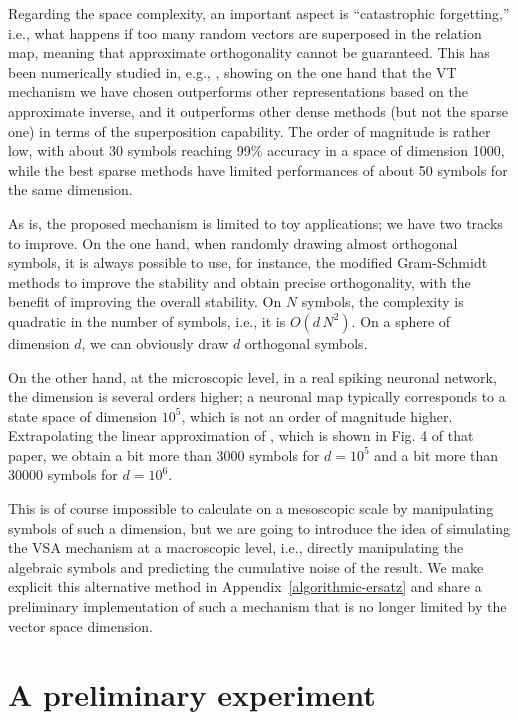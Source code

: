 \documentclass[sn-mathphys]{sn-jnl}
\begin{document}
Regarding the space complexity, an important aspect is ``catastrophic forgetting,'' i.e., what happens if too many random vectors are superposed in the relation map, meaning that approximate orthogonality cannot be guaranteed. This has been numerically studied in, e.g., \cite{schlegel_comparison_2020}, showing on the one hand that the VT mechanism we have chosen outperforms other representations based on the approximate inverse, and it outperforms other dense methods (but not the sparse one) in terms of the superposition capability. The order of magnitude is rather low, with about 30 symbols reaching 99\% accuracy in a space of dimension 1000, while the best sparse methods have limited performances of about 50 symbols for the same dimension.

As is, the proposed mechanism is limited to toy applications; we have two tracks to improve. On the one hand, when randomly drawing almost orthogonal symbols, it is always possible to use, for instance, the modified Gram-Schmidt methods to improve the stability and obtain precise orthogonality, with the benefit of improving the overall stability. On $N$ symbols, the complexity is quadratic in the number of symbols, i.e., it is $O(d\, N^2)$. On a sphere of dimension $d$, we can obviously draw $d$ orthogonal symbols.

On the other hand, at the microscopic level, in a real spiking neuronal network, the dimension is several orders higher; a neuronal map typically corresponds to a state space of dimension $10^5$, which is not an order of magnitude higher.  Extrapolating the linear approximation of \cite{schlegel_comparison_2020}, which is shown in Fig. 4 of that paper, we obtain a bit more than $3000$ symbols for $d=10^5$ and a bit more than $30000$ symbols for $d=10^6$. 

This is of course impossible to calculate on a mesoscopic scale by manipulating symbols of such a dimension, but we are going to introduce the idea of simulating the VSA mechanism at a macroscopic level, i.e., directly manipulating the algebraic symbols and predicting the cumulative noise of the result. We make explicit this alternative method in Appendix~\ref{algorithmic-ersatz} and share a preliminary implementation of such a mechanism that is no longer limited by the vector space dimension. 

\section{A preliminary experiment}
\end{document}
